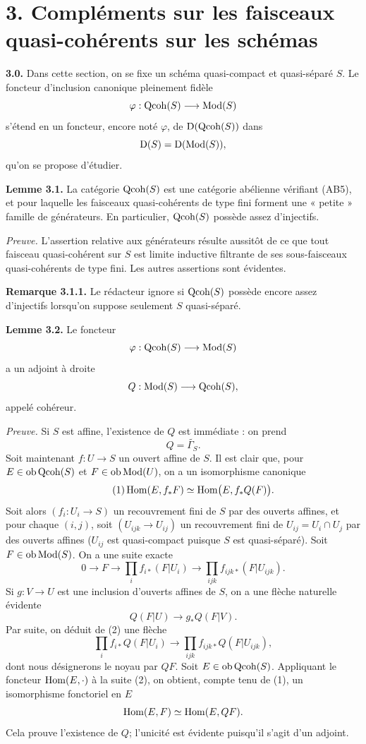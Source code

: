 \documentclass[11pt]{article}
\begin{document}
\section*{3. Compléments sur les faisceaux quasi-cohérents sur les schémas}

\textbf{3.0.} Dans cette section, on se fixe un schéma quasi-compact et quasi-séparé $S$. Le foncteur d'inclusion canonique pleinement fidèle
\[
\varphi:\operatorname{Qcoh}(S)\longrightarrow\operatorname{Mod}(S)
\]
s'étend en un foncteur, encore noté $\varphi$, de $\mathrm D(\operatorname{Qcoh}(S))$ dans
\[
\mathrm D(S)=\mathrm D(\operatorname{Mod}(S)),
\]
qu'on se propose d'étudier.

\textbf{Lemme 3.1.} La catégorie $\operatorname{Qcoh}(S)$ est une catégorie abélienne vérifiant (AB5), et pour laquelle les faisceaux quasi-cohérents de type fini forment une « petite » famille de générateurs. En particulier, $\operatorname{Qcoh}(S)$ possède assez d'injectifs.

\emph{Preuve.} L'assertion relative aux générateurs résulte aussitôt de ce que tout faisceau quasi-cohérent sur $S$ est limite inductive filtrante de ses sous-faisceaux quasi-cohérents de type fini. Les autres assertions sont évidentes.

\textbf{Remarque 3.1.1.} Le rédacteur ignore si $\operatorname{Qcoh}(S)$ possède encore assez d'injectifs lorsqu'on suppose seulement $S$ quasi-séparé.

\textbf{Lemme 3.2.} Le foncteur
\[
\varphi:\operatorname{Qcoh}(S)\longrightarrow\operatorname{Mod}(S)
\]
a un adjoint à droite
\[
Q:\operatorname{Mod}(S)\longrightarrow\operatorname{Qcoh}(S),
\]
appelé cohéreur.

\emph{Preuve.} Si $S$ est affine, l'existence de $Q$ est immédiate : on prend
\[
Q=\widetilde{\Gamma_S}.
\]
Soit maintenant $f:U\to S$ un ouvert affine de $S$. Il est clair que, pour $E\in\operatorname{ob}\operatorname{Qcoh}(S)$ et $F\in\operatorname{ob}\operatorname{Mod}(U)$, on a un isomorphisme canonique
\begin{equation}\tag{1}
\operatorname{Hom}(E,f_*F)\simeq \operatorname{Hom}\bigl(E,f_*Q(F)\bigr).
\end{equation}
Soit alors $(f_i:U_i\to S)$ un recouvrement fini de $S$ par des ouverts affines, et pour chaque $(i,j)$, soit $(U_{ijk}\to U_{ij})$ un recouvrement fini de $U_{ij}=U_i\cap U_j$ par des ouverts affines ($U_{ij}$ est quasi-compact puisque $S$ est quasi-séparé). Soit $F\in\operatorname{ob}\operatorname{Mod}(S)$. On a une suite exacte
\begin{equation}\tag{2}
0\longrightarrow F\longrightarrow \prod_i f_{i*}(F|U_i)
\longrightarrow \prod_{ijk} f_{ijk*}(F|U_{ijk}).
\end{equation}
Si $g:V\to U$ est une inclusion d'ouverts affines de $S$, on a une flèche naturelle évidente
\[
Q(F|U)\longrightarrow g_*Q(F|V).
\]
Par suite, on déduit de (2) une flèche
\begin{equation}\tag{3}
\prod_i f_{i*}Q(F|U_i)
\longrightarrow \prod_{ijk} f_{ijk*}Q(F|U_{ijk}),
\end{equation}
dont nous désignerons le noyau par $QF$. Soit $E\in\operatorname{ob}\operatorname{Qcoh}(S)$. Appliquant le foncteur $\operatorname{Hom}(E,\cdot)$ à la suite (2), on obtient, compte tenu de (1), un isomorphisme fonctoriel en $E$
\[
\operatorname{Hom}(E,F)\simeq \operatorname{Hom}(E,QF).
\]
Cela prouve l'existence de $Q$; l'unicité est évidente puisqu'il s'agit d'un adjoint.
\end{document}
